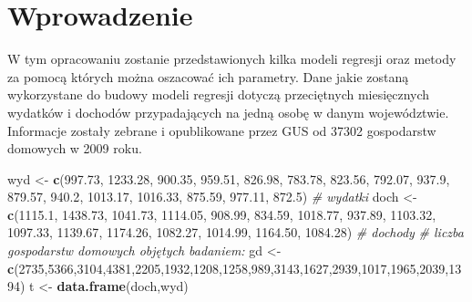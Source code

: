 \documentclass[polish,]{book}
\newenvironment{Shaded}{\begin{snugshade}}{\end{snugshade}}
\newcommand{\CommentTok}[1]{\textcolor[rgb]{0.56,0.35,0.01}{\textit{#1}}}
\newcommand{\DecValTok}[1]{\textcolor[rgb]{0.00,0.00,0.81}{#1}}
\newcommand{\FloatTok}[1]{\textcolor[rgb]{0.00,0.00,0.81}{#1}}
\newcommand{\KeywordTok}[1]{\textcolor[rgb]{0.13,0.29,0.53}{\textbf{#1}}}
\newcommand{\NormalTok}[1]{#1}
\newcommand{\StringTok}[1]{\textcolor[rgb]{0.31,0.60,0.02}{#1}}
\begin{document}
\hypertarget{part_13.1}{%
\section{Wprowadzenie}\label{part_13.1}}

W tym opracowaniu zostanie przedstawionych kilka modeli regresji oraz metody za
pomocą których można oszacować ich parametry. Dane jakie zostaną wykorzystane
do budowy modeli regresji dotyczą przeciętnych miesięcznych wydatków i dochodów
przypadających na jedną osobę w danym województwie. Informacje zostały zebrane
i opublikowane przez GUS od 37302 gospodarstw domowych w 2009 roku.

\begin{Shaded}
\begin{Highlighting}[]
\NormalTok{wyd <-}\StringTok{ }\KeywordTok{c}\NormalTok{(}\FloatTok{997.73}\NormalTok{, }\FloatTok{1233.28}\NormalTok{, }\FloatTok{900.35}\NormalTok{, }\FloatTok{959.51}\NormalTok{, }\FloatTok{826.98}\NormalTok{, }\FloatTok{783.78}\NormalTok{, }\FloatTok{823.56}\NormalTok{, }\FloatTok{792.07}\NormalTok{, }\FloatTok{937.9}\NormalTok{, }\FloatTok{879.57}\NormalTok{,}
         \FloatTok{940.2}\NormalTok{, }\FloatTok{1013.17}\NormalTok{, }\FloatTok{1016.33}\NormalTok{, }\FloatTok{875.59}\NormalTok{, }\FloatTok{977.11}\NormalTok{, }\FloatTok{872.5}\NormalTok{) }\CommentTok{# wydatki}
\NormalTok{doch <-}\StringTok{ }\KeywordTok{c}\NormalTok{(}\FloatTok{1115.1}\NormalTok{, }\FloatTok{1438.73}\NormalTok{, }\FloatTok{1041.73}\NormalTok{, }\FloatTok{1114.05}\NormalTok{, }\FloatTok{908.99}\NormalTok{, }\FloatTok{834.59}\NormalTok{, }\FloatTok{1018.77}\NormalTok{, }\FloatTok{937.89}\NormalTok{, }\FloatTok{1103.32}\NormalTok{,}
          \FloatTok{1097.33}\NormalTok{, }\FloatTok{1139.67}\NormalTok{, }\FloatTok{1174.26}\NormalTok{, }\FloatTok{1082.27}\NormalTok{, }\FloatTok{1014.99}\NormalTok{, }\FloatTok{1164.50}\NormalTok{, }\FloatTok{1084.28}\NormalTok{) }\CommentTok{# dochody}
\CommentTok{# liczba gospodarstw domowych objętych badaniem:}
\NormalTok{gd <-}\StringTok{ }\KeywordTok{c}\NormalTok{(}\DecValTok{2735}\NormalTok{,}\DecValTok{5366}\NormalTok{,}\DecValTok{3104}\NormalTok{,}\DecValTok{4381}\NormalTok{,}\DecValTok{2205}\NormalTok{,}\DecValTok{1932}\NormalTok{,}\DecValTok{1208}\NormalTok{,}\DecValTok{1258}\NormalTok{,}\DecValTok{989}\NormalTok{,}\DecValTok{3143}\NormalTok{,}\DecValTok{1627}\NormalTok{,}\DecValTok{2939}\NormalTok{,}\DecValTok{1017}\NormalTok{,}\DecValTok{1965}\NormalTok{,}\DecValTok{2039}\NormalTok{,}\DecValTok{1394}\NormalTok{)}
\NormalTok{t <-}\StringTok{ }\KeywordTok{data.frame}\NormalTok{(doch,wyd)}
\end{Highlighting}
\end{Shaded}
\end{document}
